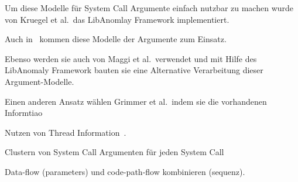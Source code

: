         Um diese Modelle für System Call Argumente einfach nutzbar zu machen wurde von Kruegel et al.\ das LibAnomlay Framework implementiert.~\cite{ARGUMENTS}

        Auch in~\cite{ARGUMENTS2} kommen diese Modelle der Argumente zum Einsatz.
        
        Ebenso werden sie auch von Maggi et al.\ verwendet und mit Hilfe des LibAnomaly Framework bauten sie eine Alternative Verarbeitung dieser Argument-Modelle.~\cite{MAGGI}

        Einen anderen Ansatz wählen Grimmer et al.\ indem sie die vorhandenen Informtiao


        Nutzen von Thread Information~\cite{IDSTHREADGRIMMER2021}.

        Clustern von System Call Argumenten für jeden System Call~\cite{ARGUMENTCLUSTERKOUCHAM2015}

        Data-flow (parameters) und code-path-flow kombinieren (sequenz).


